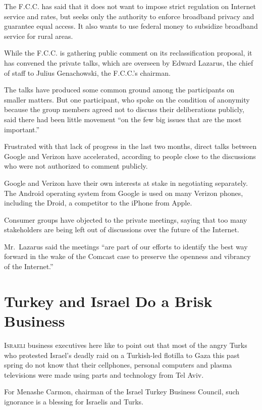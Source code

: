 ﻿\documentclass[12pt]{article}
\begin{document}
The F.C.C. has said that it does not want to impose strict regulation on Internet service and rates,
but seeks only the authority to enforce broadband privacy and guarantee equal access. It also wants
to use federal money to subsidize broadband service for rural areas.

While the F.C.C. is gathering public comment on its reclassification proposal, it has convened the
private talks, which are overseen by Edward Lazarus, the chief of staff to Julius Genachowski, the
F.C.C.'s chairman.

The talks have produced some common ground among the participants on smaller matters. But one
participant, who spoke on the condition of anonymity because the group members agreed not to discuss
their deliberations publicly, said there had been little movement ``on the few big issues that are
the most important.''

Frustrated with that lack of progress in the last two months, direct talks between Google and
Verizon have accelerated, according to people close to the discussions who were not authorized to
comment publicly.

Google and Verizon have their own interests at stake in negotiating separately. The Android
operating system from Google is used on many Verizon phones, including the Droid, a competitor to
the iPhone from Apple.

Consumer groups have objected to the private meetings, saying that too many stakeholders are being
left out of discussions over the future of the Internet.

Mr.~Lazarus said the meetings ``are part of our efforts to identify the best way forward in the wake
of the Comcast case to preserve the openness and vibrancy of the Internet.''

\section{Turkey and Israel Do a Brisk Business}

\lettrine{I}{sraeli} business executives here like to point out that most of
the angry Turks who protested Israel's deadly raid on a Turkish-led flotilla to Gaza this past
spring do not know that their cellphones, personal computers and plasma televisions were made using
parts and technology from Tel Aviv.

For Menashe Carmon, chairman of the Israel Turkey Business Council, such ignorance is a blessing for
Israelis and Turks.
\end{document}
